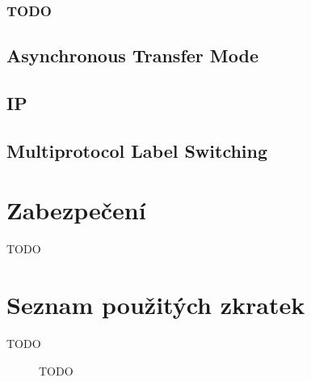 \documentclass[thesis=B,czech]{FITthesis}[2012/06/26]
\begin{document}
    \subsection{TODO}

  \section{Asynchronous Transfer Mode}
  \section{IP}
  \section{Multiprotocol Label Switching}

\chapter{Zabezpečení}

\begin{conclusion}

    TODO

\end{conclusion}




\appendix

\chapter{Seznam použitých zkratek}
\begin{description}

    \item[TODO] TODO

\end{description}
\end{document}
